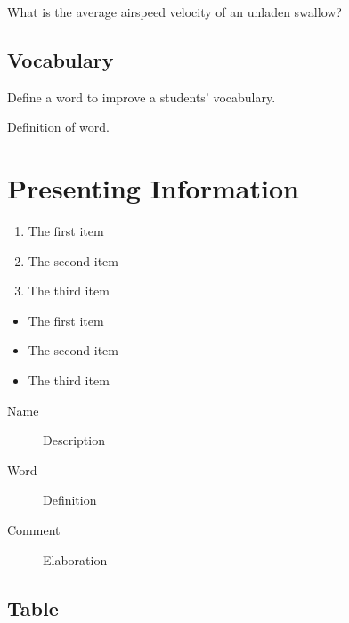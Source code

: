 \documentclass[11pt,twoside]{book} %
\begin{document}
\begin{problem}
What is the average airspeed velocity of an unladen swallow?
\end{problem}


\section{Vocabulary}

Define a word to improve a students' vocabulary.

\begin{vocabulary}[Word]
    Definition of word.
\end{vocabulary}



\chapter{Presenting Information}


\begin{enumerate}
    \item The first item
    \item The second item
    \item The third item
\end{enumerate}


\begin{itemize}
    \item The first item
    \item The second item
    \item The third item
\end{itemize}

\begin{description}
    \item[Name] Description
    \item[Word] Definition
    \item[Comment] Elaboration
\end{description}

\section{Table}
\end{document}
